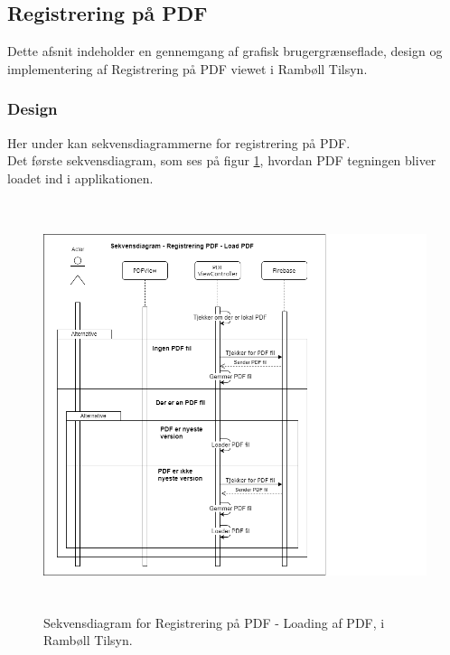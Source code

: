 \subsection{Registrering på PDF}
Dette afsnit indeholder en gennemgang af grafisk brugergrænseflade, design og implementering af Registrering på PDF viewet i Rambøll Tilsyn.

\subsubsection{Design}
Her under kan sekvensdiagrammerne for registrering på PDF. \\
Det første sekvensdiagram, som ses på figur \ref{fig:LoadPDFSekvensDiagram}, hvordan PDF tegningen bliver loadet ind i applikationen.
\begin{figure}[H] %
	\centering
	\includegraphics[height=12cm, width=15cm]{../ArkitekturDesign/Design/RegisterPDF/LoadPDFSekvensDiagram}
	\caption{Sekvensdiagram for Registrering på PDF - Loading af PDF, i Rambøll Tilsyn.}
	\label{fig:LoadPDFSekvensDiagram}
\end{figure}

\clearpage

